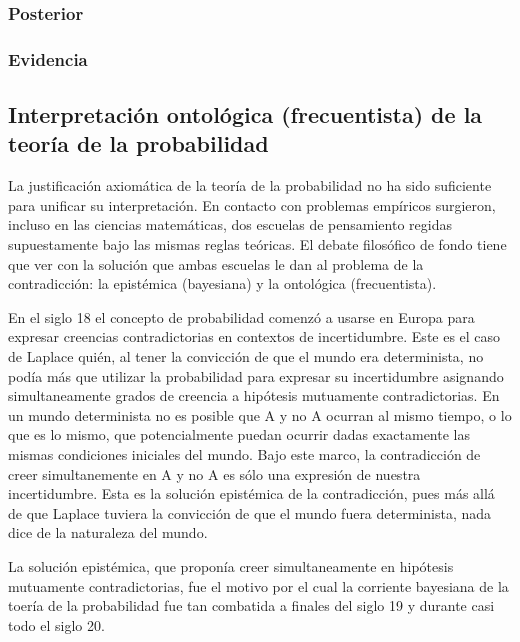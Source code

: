 \documentclass[a4paper,10pt]{book}
\theoremstyle{definition}
\begin{document}
\subsubsection*{Posterior}

\subsubsection*{Evidencia}

\subsection{Interpretación ontológica (frecuentista) de la teoría de la probabilidad}
% 
% 


La justificación axiomática de la teoría de la probabilidad no ha sido suficiente para unificar su interpretación.
En contacto con problemas empíricos surgieron, incluso en las ciencias matemáticas, dos escuelas de pensamiento regidas supuestamente bajo las mismas reglas teóricas.
El debate filosófico de fondo tiene que ver con la solución que ambas escuelas le dan al problema de la contradicción: la epistémica (bayesiana) y la ontológica (frecuentista).

En el siglo 18 el concepto de probabilidad comenzó a usarse en Europa para expresar creencias contradictorias en contextos de incertidumbre.
Este es el caso de Laplace quién, al tener la convicción de que el mundo era determinista, no podía más que utilizar la probabilidad para expresar su incertidumbre asignando simultaneamente grados de creencia a hipótesis mutuamente contradictorias.
En un mundo determinista no es posible que A y no A ocurran al mismo tiempo, o lo que es lo mismo, que potencialmente puedan ocurrir dadas exactamente las mismas condiciones iniciales del mundo.
Bajo este marco, la contradicción de creer simultanemente en A y no A es sólo una expresión de nuestra incertidumbre.
Esta es la solución epistémica de la contradicción, pues más allá de que Laplace tuviera la convicción de que el mundo fuera determinista, nada dice de la naturaleza del mundo.

La solución epistémica, que proponía creer simultaneamente en hipótesis mutuamente contradictorias, fue el motivo por el cual la corriente bayesiana de la toería de la probabilidad fue tan combatida a finales del siglo 19 y durante casi todo el siglo 20.
\end{document}
